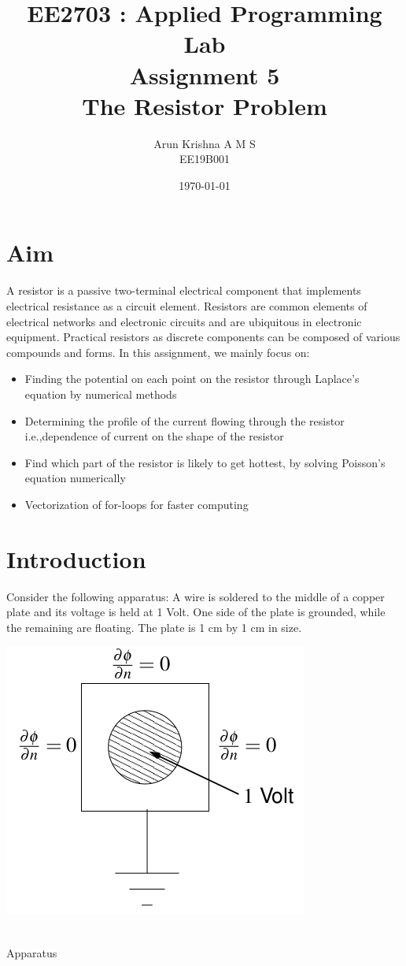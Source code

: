 \documentclass[12pt, a4paper]{report}
\title{\textbf{EE2703 : Applied Programming Lab \\ Assignment 5 \\ The Resistor Problem}} %
\author{Arun Krishna A M S \\ EE19B001} %
\date{\today} %
\begin{document}
		
		
\maketitle %
\justifying

\section*{Aim}
A resistor is a passive two-terminal electrical component that implements electrical resistance as a circuit element. Resistors are common elements of electrical networks and electronic circuits and are ubiquitous in electronic equipment. Practical resistors as discrete components can be composed of various compounds and forms. In this assignment, we mainly focus on:
\begin{itemize}
  	\item Finding the potential on each point on the resistor through Laplace's equation by numerical methods
  	\item Determining the profile of the current flowing through the resistor i.e.,dependence of current on the shape of the resistor
  	\item Find which part of the resistor is likely to get hottest, by solving Poisson's equation numerically
  	\item Vectorization of for-loops for faster computing
\end{itemize}

\section*{Introduction}
Consider the following apparatus:
A wire is soldered to the middle of a copper plate and its voltage is held at 1 Volt. One side of the plate is grounded, while the remaining are floating. The plate is 1 cm by 1 cm in size.
\begin{center}
	\includegraphics[scale=0.60]{Figure1} 
	\caption{\\Apparatus}
	\label{fig:rawdata}
\end{center}
\end{document}
